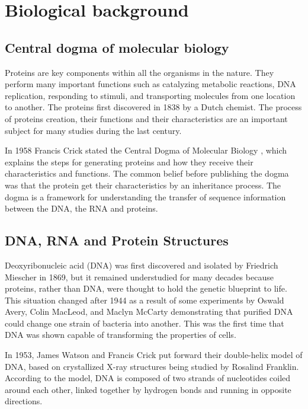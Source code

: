 \chapter{Biological background}
\label{chap:biobackground}

\section{Central dogma of molecular biology}
Proteins are key components within all the organisms in the nature. They perform many important functions such as catalyzing metabolic reactions, DNA replication, responding to stimuli, and transporting molecules from one location to another. The proteins first discovered in 1838 by a Dutch chemist. The process of proteins creation, their functions and their characteristics are an important subject for many studies during the last century. 

In 1958 Francis Crick stated the Central Dogma of Molecular Biology \cite{CRICK1970}, which explains the steps for generating proteins and how they receive their characteristics and functions. The common belief before publishing the dogma was that the protein get their characteristics by an inheritance process. 
The dogma is a framework for understanding the transfer of sequence information between the DNA, the RNA and proteins. 


\section{DNA, RNA and Protein Structures}
Deoxyribonucleic acid (DNA) was first discovered and isolated by Friedrich Miescher in 1869, but it remained understudied for many decades because proteins, rather than DNA, were thought to hold the genetic blueprint to life. This situation changed after 1944 as a result of some experiments by Oswald Avery, Colin MacLeod, and Maclyn McCarty demonstrating that purified DNA could change one strain of bacteria into another. This was the first time that DNA was shown capable of transforming the properties of cells.

In 1953, James Watson and Francis Crick put forward their double-helix model of DNA, based on crystallized X-ray structures being studied by Rosalind Franklin. According to the model, DNA is composed of two strands of nucleotides coiled around each other, linked together by hydrogen bonds and running in opposite directions. 

